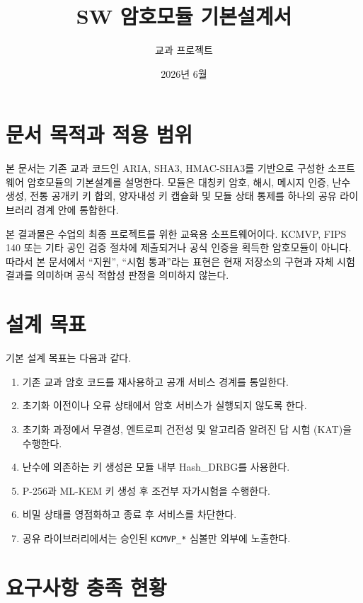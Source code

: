 \documentclass[11pt,a4paper]{article}
\title{SW 암호모듈 기본설계서}
\author{교과 프로젝트}
\date{2026년 6월}
\begin{document}
\maketitle
\tableofcontents
\newpage

\section{문서 목적과 적용 범위}

본 문서는 기존 교과 코드인 ARIA, SHA3, HMAC-SHA3를 기반으로 구성한
소프트웨어 암호모듈의 기본설계를 설명한다. 모듈은 대칭키 암호, 해시,
메시지 인증, 난수 생성, 전통 공개키 키 합의, 양자내성 키 캡슐화 및
모듈 상태 통제를 하나의 공유 라이브러리 경계 안에 통합한다.

본 결과물은 수업의 최종 프로젝트를 위한 교육용 소프트웨어이다. KCMVP,
FIPS 140 또는 기타 공인 검증 절차에 제출되거나 공식 인증을 획득한
암호모듈이 아니다. 따라서 본 문서에서 ``지원'', ``시험 통과''라는 표현은
현재 저장소의 구현과 자체 시험 결과를 의미하며 공식 적합성 판정을
의미하지 않는다.

\section{설계 목표}

기본 설계 목표는 다음과 같다.

\begin{enumerate}
  \item 기존 교과 암호 코드를 재사용하고 공개 서비스 경계를 통일한다.
  \item 초기화 이전이나 오류 상태에서 암호 서비스가 실행되지 않도록 한다.
  \item 초기화 과정에서 무결성, 엔트로피 건전성 및 알고리즘 알려진 답 시험
        (KAT)을 수행한다.
  \item 난수에 의존하는 키 생성은 모듈 내부 Hash\_DRBG를 사용한다.
  \item P-256과 ML-KEM 키 생성 후 조건부 자가시험을 수행한다.
  \item 비밀 상태를 영점화하고 종료 후 서비스를 차단한다.
  \item 공유 라이브러리에서는 승인된 \texttt{KCMVP\_*} 심볼만 외부에 노출한다.
\end{enumerate}

\section{요구사항 충족 현황}
\end{document}
